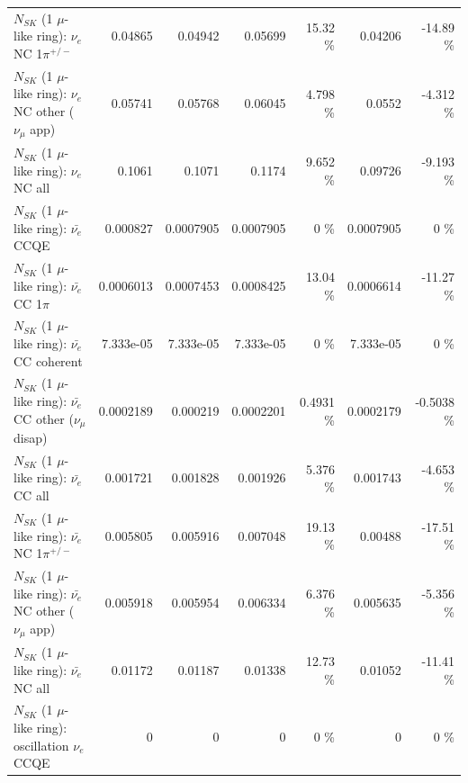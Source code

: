 \begin{table}
\begin{tabular}{| l | r | r | r  r | r  r |}
\hline
                           $N_{SK}$ (1 $\mu$-like ring): $\nu_e$ NC 1$\pi^{+/-}$ &         0.04865 &         0.04942 &         0.05699 &    15.32 \%  &         0.04206 &   -14.89 \%  \\ 
                  $N_{SK}$ (1 $\mu$-like ring): $\nu_e$ NC other ($\nu_\mu$ app) &         0.05741 &         0.05768 &         0.06045 &    4.798 \%  &          0.0552 &   -4.312 \%  \\ 
                                  $N_{SK}$ (1 $\mu$-like ring): $\nu_{e}$ NC all &          0.1061 &          0.1071 &          0.1174 &    9.652 \%  &         0.09726 &   -9.193 \%  \\ 
\hline
\hline
\hline
                                $N_{SK}$ (1 $\mu$-like ring): $\bar{\nu_e}$ CCQE &        0.000827 &       0.0007905 &       0.0007905 &        0 \%  &       0.0007905 &        0 \%  \\ 
                           $N_{SK}$ (1 $\mu$-like ring): $\bar{\nu_e}$ CC 1$\pi$ &       0.0006013 &       0.0007453 &       0.0008425 &    13.04 \%  &       0.0006614 &   -11.27 \%  \\ 
                         $N_{SK}$ (1 $\mu$-like ring): $\bar{\nu_e}$ CC coherent &       7.333e-05 &       7.333e-05 &       7.333e-05 &        0 \%  &       7.333e-05 &        0 \%  \\ 
          $N_{SK}$ (1 $\mu$-like ring): $\bar{\nu_e}$ CC other ($\nu_\mu$ disap) &       0.0002189 &        0.000219 &       0.0002201 &   0.4931 \%  &       0.0002179 &  -0.5038 \%  \\ 
                            $N_{SK}$ (1 $\mu$-like ring): $\bar{\nu_{e}}$ CC all &        0.001721 &        0.001828 &        0.001926 &    5.376 \%  &        0.001743 &   -4.653 \%  \\ 
\hline
                     $N_{SK}$ (1 $\mu$-like ring): $\bar{\nu_e}$ NC 1$\pi^{+/-}$ &        0.005805 &        0.005916 &        0.007048 &    19.13 \%  &         0.00488 &   -17.51 \%  \\ 
            $N_{SK}$ (1 $\mu$-like ring): $\bar{\nu_e}$ NC other ($\nu_\mu$ app) &        0.005918 &        0.005954 &        0.006334 &    6.376 \%  &        0.005635 &   -5.356 \%  \\ 
                            $N_{SK}$ (1 $\mu$-like ring): $\bar{\nu_{e}}$ NC all &         0.01172 &         0.01187 &         0.01338 &    12.73 \%  &         0.01052 &   -11.41 \%  \\ 
\hline
\hline
\hline
                          $N_{SK}$ (1 $\mu$-like ring): oscillation $\nu_e$ CCQE &               0 &               0 &               0 &        0 \%  &               0 &        0 \%  \\ 

\end{tabular}
\end{table}
